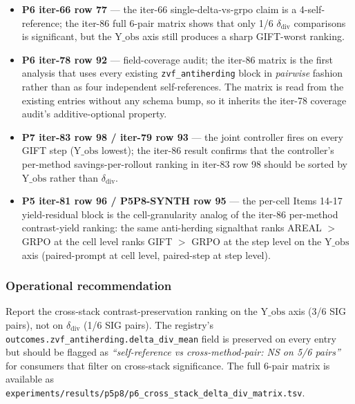 \documentclass{article}
\begin{document}
\begin{itemize}
\item \textbf{P6 iter-66 row 77} --- the iter-66 single-delta-vs-grpo
      claim is a 4-self-reference; the iter-86 full 6-pair matrix
      shows that only 1/6 $\delta_{\mathrm{div}}$ comparisons is
      significant, but the $\mathrm{Y\_obs}$ axis still produces a
      sharp GIFT-worst ranking.
\item \textbf{P6 iter-78 row 92} --- field-coverage audit; the iter-86
      matrix is the first analysis that uses every existing
      \texttt{zvf\_antiherding} block in \emph{pairwise} fashion rather
      than as four independent self-references. The matrix is read
      from the existing entries without any schema bump, so it
      inherits the iter-78 coverage audit's additive-optional property.
\item \textbf{P7 iter-83 row 98 / iter-79 row 93} --- the joint
      controller fires on every GIFT step ($\mathrm{Y\_obs}$ lowest);
      the iter-86 result confirms that the controller's per-method
      savings-per-rollout ranking in iter-83 row 98 should be
      sorted by $\mathrm{Y\_obs}$ rather than $\delta_{\mathrm{div}}$.
\item \textbf{P5 iter-81 row 96 / P5P8-SYNTH row 95} --- the per-cell
      Items 14-17 yield-residual block is the cell-granularity analog
      of the iter-86 per-method contrast-yield ranking: the same
      anti-herding signalthat ranks AREAL $>$ GRPO at the cell level
      ranks GIFT $>$ GRPO at the step level on the $\mathrm{Y\_obs}$
      axis (paired-prompt at cell level, paired-step at step level).
\end{itemize}

\subsubsection{Operational recommendation}

Report the cross-stack contrast-preservation ranking on the
$\mathrm{Y\_obs}$ axis (3/6 SIG pairs), not on $\delta_{\mathrm{div}}$
(1/6 SIG pairs). The registry's
\texttt{outcomes.zvf\_antiherding.delta\_div\_mean} field is preserved
on every entry but should be flagged as
\textit{``self-reference vs cross-method-pair: NS on 5/6 pairs''} for
consumers that filter on cross-stack significance.
The full 6-pair matrix is available as
\texttt{experiments/results/p5p8/p6\_cross\_stack\_delta\_div\_matrix.tsv}.

 
\end{document}

